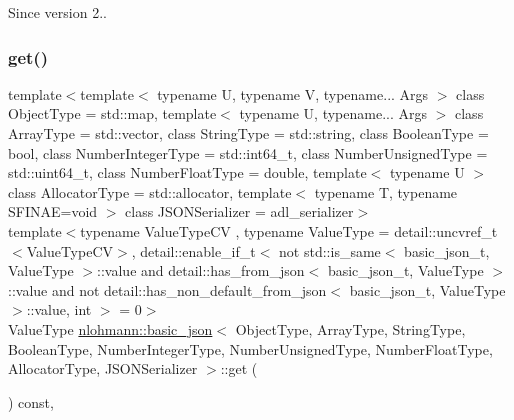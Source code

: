 \begin{DoxySince}{Since}
version 2.. 
\end{DoxySince}
\mbox{\label{classnlohmann_1_1basic__json_aa6602bb24022183ab989439e19345d08}} 
\subsubsection{\texorpdfstring{get()}{get()}\hspace{0.1cm}{\footnotesize\ttfamily [2/5]}}
{\footnotesize\ttfamily template$<$template$<$ typename U, typename V, typename... Args $>$ class Object\+Type = std\+::map, template$<$ typename U, typename... Args $>$ class Array\+Type = std\+::vector, class String\+Type  = std\+::string, class Boolean\+Type  = bool, class Number\+Integer\+Type  = std\+::int64\+\_\+t, class Number\+Unsigned\+Type  = std\+::uint64\+\_\+t, class Number\+Float\+Type  = double, template$<$ typename U $>$ class Allocator\+Type = std\+::allocator, template$<$ typename T, typename S\+F\+I\+N\+A\+E=void $>$ class J\+S\+O\+N\+Serializer = adl\+\_\+serializer$>$ \\
template$<$typename Value\+Type\+CV , typename Value\+Type  = detail\+::uncvref\+\_\+t$<$\+Value\+Type\+C\+V$>$, detail\+::enable\+\_\+if\+\_\+t$<$ not std\+::is\+\_\+same$<$ basic\+\_\+json\+\_\+t, Value\+Type $>$\+::value and detail\+::has\+\_\+from\+\_\+json$<$ basic\+\_\+json\+\_\+t, Value\+Type $>$\+::value and not detail\+::has\+\_\+non\+\_\+default\+\_\+from\+\_\+json$<$ basic\+\_\+json\+\_\+t, Value\+Type $>$\+::value, int $>$  = 0$>$ \\
Value\+Type \mbox{\hyperlink{classnlohmann_1_1basic__json}{nlohmann\+::basic\+\_\+json}}$<$ Object\+Type, Array\+Type, String\+Type, Boolean\+Type, Number\+Integer\+Type, Number\+Unsigned\+Type, Number\+Float\+Type, Allocator\+Type, J\+S\+O\+N\+Serializer $>$\+::get (\begin{DoxyParamCaption}{ }\end{DoxyParamCaption}) const\hspace{0.3cm}{\ttfamily [inline]}, {\ttfamily [noexcept]}}



